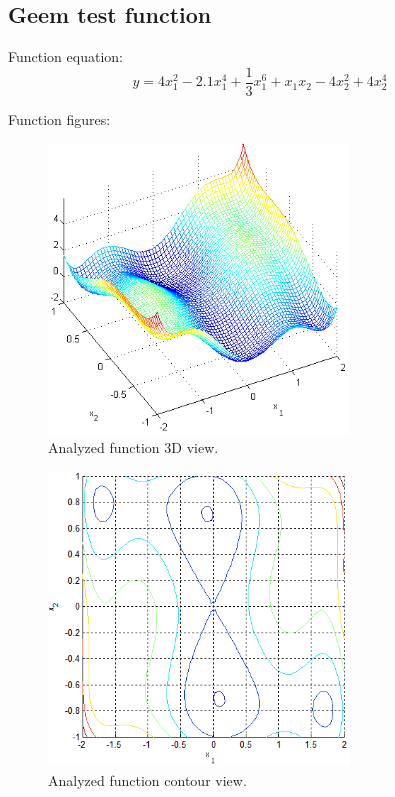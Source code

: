 \documentclass[12pt]{article}
\begin{document}
\subsection{Geem test function}
Function equation:
\begin{equation}
y=4x_1^2-2.1x_1^4+\frac{1}{3}x_1^6+x_1x_2-4x_2^2+4x_2^4
\end{equation}

Function figures:
\begin{figure}[H]
	\begin{center}
		\includegraphics[width=8cm]{gem_3D.png}
		\caption{Analyzed function 3D view.}
	\end{center}
\end{figure}
\begin{figure}[H]
	\begin{center}
		\includegraphics[width=8cm]{gem_cont.png}
		\caption{Analyzed function contour view.}
	\end{center}
\end{figure}
\end{document}
